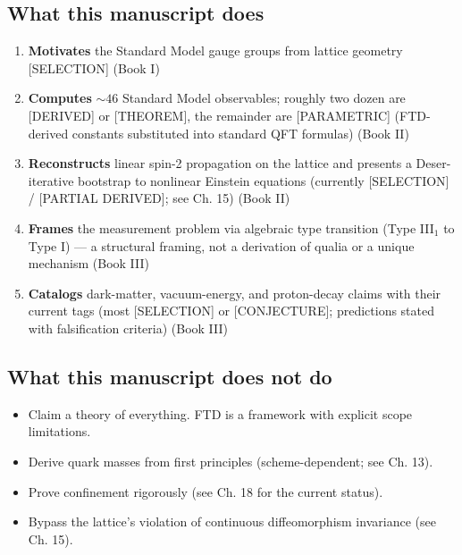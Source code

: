 \documentclass[
  11pt,
  letterpaper,
  twoside,
  openany]{book}
\makeatletter
\providecommand{\tightlist}{%
  \setlength{\itemsep}{0pt}\setlength{\parskip}{0pt}}
\let\orig@subsection\subsection
\renewcommand{\subsection}{\needspace{6\baselineskip}\orig@subsection}
\makeatother
\begin{document}
\subsection*{What this manuscript does}\label{what-this-manuscript-does}

\begin{enumerate}
\def\labelenumi{\arabic{enumi}.}
\tightlist
\item
  \textbf{Motivates} the Standard Model gauge groups from lattice
  geometry {[}SELECTION{]} (Book I)
\item
  \textbf{Computes} \(\sim 46\) Standard Model observables; roughly two
  dozen are {[}DERIVED{]} or {[}THEOREM{]}, the remainder are
  {[}PARAMETRIC{]} (FTD-derived constants substituted into standard QFT
  formulas) (Book II)
\item
  \textbf{Reconstructs} linear spin-2 propagation on the lattice and
  presents a Deser-iterative bootstrap to nonlinear Einstein equations
  (currently {[}SELECTION{]} / {[}PARTIAL DERIVED{]}; see Ch. 15) (Book
  II)
\item
  \textbf{Frames} the measurement problem via algebraic type transition
  (Type III\(_1\) to Type I) --- a structural framing, not a derivation
  of qualia or a unique mechanism (Book III)
\item
  \textbf{Catalogs} dark-matter, vacuum-energy, and proton-decay claims
  with their current tags (most {[}SELECTION{]} or {[}CONJECTURE{]};
  predictions stated with falsification criteria) (Book III)
\end{enumerate}

\subsection*{What this manuscript does not
do}\label{what-this-manuscript-does-not-do}

\begin{itemize}
\tightlist
\item
  Claim a theory of everything. FTD is a framework with explicit scope
  limitations.
\item
  Derive quark masses from first principles (scheme-dependent; see Ch.
  13).
\item
  Prove confinement rigorously (see Ch. 18 for the current status).
\item
  Bypass the lattice's violation of continuous diffeomorphism invariance
  (see Ch. 15).
\end{itemize}
\end{document}
